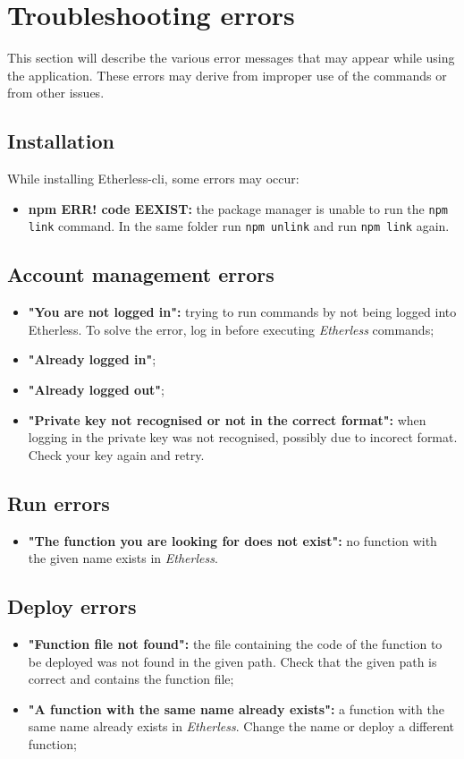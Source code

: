 \section{Troubleshooting errors}
  This section will describe the various error messages that may appear while using the application. These errors may derive from improper use of the commands or from other issues.
  \subsection{Installation}
    While installing Etherless-cli, some errors may occur:
    \begin{itemize}
      \item \textbf{npm ERR! code EEXIST:} the package manager is unable to run the \texttt{npm link} command. In the same folder run \texttt{npm unlink} and run \texttt{npm link} again.
    \end{itemize}
  \subsection{Account management errors}
    \begin{itemize}
      \item \textbf{"You are not logged in":} trying to run commands by not being logged into Etherless. To solve the error, log in before executing \textit{Etherless} commands;
      \item \textbf{"Already logged in"};
      \item \textbf{"Already logged out"};
      \item \textbf{"Private key not recognised or not in the correct format":} when logging in the private key was not recognised, possibly due to incorect format. Check your key again and retry.
    \end{itemize}
  \subsection{Run errors}
  \begin{itemize}
    \item \textbf{"The function you are looking for does not exist":} no function with the given name exists in \textit{Etherless}.
  \end{itemize}
  \subsection{Deploy errors}
  \begin{itemize}
    \item \textbf{"Function file not found":} the file containing the code of the function to be deployed was not found in the given path. Check that the given path is correct and contains the function file;
    \item \textbf{"A function with the same name already exists":} a function with the same name already exists in \textit{Etherless}. Change the name or deploy a different function;
  \end{itemize}
